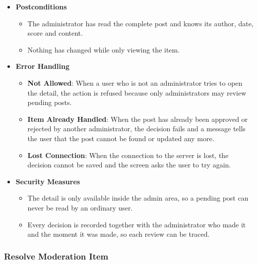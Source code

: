 \begin{itemize}[leftmargin=1.6em,topsep=4pt,itemsep=3pt,parsep=0pt,label=$\bullet$]
\begin{itemize}[leftmargin=2.2em,topsep=2pt,itemsep=3pt,parsep=0pt,label=$\circ$]
            \item \textbf{Close Without Deciding}: When the user closes the dialog without pressing a button, no decision is recorded and the post stays in the queue.
        \end{itemize}
    \item \textbf{Postconditions}
        \begin{itemize}[leftmargin=2.2em,topsep=2pt,itemsep=3pt,parsep=0pt,label=$\circ$]
            \item The administrator has read the complete post and knows its author, date, score and content.
            \item Nothing has changed while only viewing the item.
        \end{itemize}
    \item \textbf{Error Handling}
        \begin{itemize}[leftmargin=2.2em,topsep=2pt,itemsep=3pt,parsep=0pt,label=$\circ$]
            \item \textbf{Not Allowed}: When a user who is not an administrator tries to open the detail, the action is refused because only administrators may review pending posts.
            \item \textbf{Item Already Handled}: When the post has already been approved or rejected by another administrator, the decision fails and a message tells the user that the post cannot be found or updated any more.
            \item \textbf{Lost Connection}: When the connection to the server is lost, the decision cannot be saved and the screen asks the user to try again.
        \end{itemize}
    \item \textbf{Security Measures}
        \begin{itemize}[leftmargin=2.2em,topsep=2pt,itemsep=3pt,parsep=0pt,label=$\circ$]
            \item The detail is only available inside the admin area, so a pending post can never be read by an ordinary user.
            \item Every decision is recorded together with the administrator who made it and the moment it was made, so each review can be traced.
        \end{itemize}
\end{itemize}


\subsubsection{Resolve Moderation Item}

